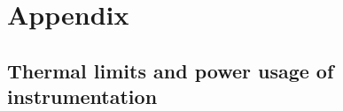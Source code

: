 \section{Appendix}
\label{sec:appendix_5}

\subsection{Thermal limits and power usage of instrumentation}
\label{subsec:thermal_limits}

